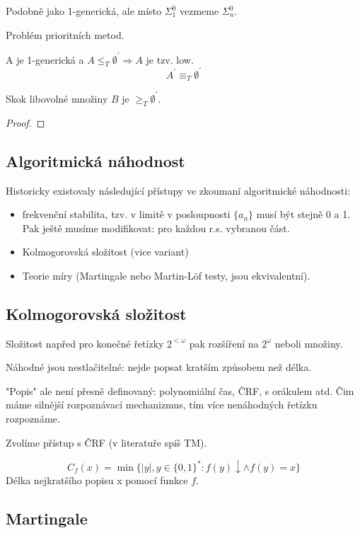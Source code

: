 \begin{definition}[n-generická]
	Podobně jako 1-generická, ale místo $\Sigma_1^0$ vezmeme $\Sigma_n^0$.
\end{definition}

\begin{note}
	Problém prioritních metod.
\end{note}

\begin{theorem}[Low]
	A je 1-generická a $A \leq_T \emptyset^{\prime} \Rightarrow A$ je tzv. low.
	\[ A^{\prime} \equiv_T \emptyset^{\prime} \]

	Skok libovolné množiny $B$ je $\geq_T \emptyset^{\prime}$.
\end{theorem}
\begin{proof}
\end{proof}

\subsection{Algoritmická náhodnost}

Historicky existovaly následující přístupy ve zkoumaní algoritmické náhodnosti:
\begin{itemize}
	\item frekvenční stabilita, tzv. v limitě v posloupnosti $\{ a_n \}$ musí být stejně 0 a 1.
		Pak ještě musíme modifikovat: pro každou r.s. vybranou část.
	\item Kolmogorovská složitost (vice variant)
	\item Teorie míry (Martingale nebo Martin-L\"{o}f testy, jsou ekvivalentní).
\end{itemize}

\subsection{Kolmogorovská složitost}

Složitost napřed pro konečné řetízky $2^{< \omega}$ pak rozšíření na $2^{\omega}$ neboli množiny.
\begin{note}
	Náhodné jsou nestlačitelné: nejde popsat kratším způsobem než délka.

	"Popis" ale není přesně definovaný: polynomiální čas, ČRF, s orákulem atd.
	Čim máme silnější rozpoznávací mechanizmus, tím více nenáhodných řetízku rozpoznáme.
\end{note}

Zvolíme přístup s ČRF (v literatuře spíš TM).

\begin{definition}
	\[ C_f(x) = \min \{ |y|, y \in \{ 0, 1 \}^{\ast}: f(y) \downarrow \land f(y) = x \} \]
	Délka nejkratšího popisu x pomocí funkce $f$.
\end{definition}

\subsection{Martingale}
